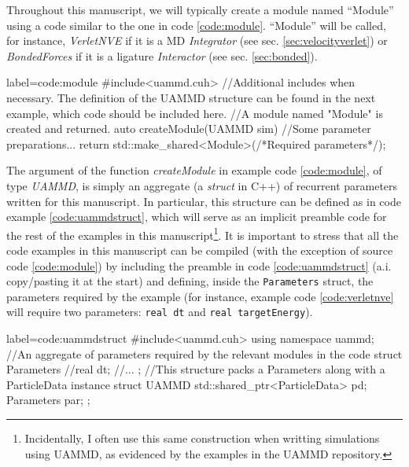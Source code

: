 \documentclass[ twoside,openright,titlepage,numbers=noenddot,%
headinclude,footinclude,cleardoublepage=empty,abstract=on,
BCOR=5mm,paper=a4,fontsize=11pt, dvipsnames
]{scrreprt}
\def\ucpp{uammd_cpp_lexer.py:UAMMDCppLexer -x}
\newcommand{\uammd}{\gls{UAMMD}\xspace}
\begin{document}
Throughout this manuscript, we will typically create a module named ``Module'' using a code similar to the one in code \ref{code:module}. ``Module'' will be called, for instance, \emph{VerletNVE} if it is a \gls{MD} \emph{Integrator} (see sec. \ref{sec:velocityverlet}) or \emph{BondedForces} if it is a ligature \emph{Interactor} (see sec. \ref{sec:bonded}).

\begin{code2}{label=code:module}
#include<uammd.cuh>
//Additional includes when necessary. The definition of the UAMMD structure can be found in the next example, which code should be included here.
//A module named "Module" is created and returned.
auto createModule(UAMMD sim){
  //Some parameter preparations...
  return std::make_shared<Module>(/*Required parameters*/);
}
\end{code2}

The argument of the function \emph{createModule} in example code \ref{code:module}, of type \emph{UAMMD}, is simply an aggregate (a \emph{struct} in C++) of recurrent parameters written for this manuscript. In particular, this structure can be defined as in code example \ref{code:uammdstruct}, which will serve as an implicit preamble code for the rest of the examples in this manuscript\footnote{Incidentally, I often use this same construction when writting simulations using \uammd, as evidenced by the examples in the UAMMD repository.}. It is important to stress that all the code examples in this manuscript can be compiled (with the exception of source code \ref{code:module}) by including the preamble in code \ref{code:uammdstruct} (a.i. copy/pasting it at the start) and defining, inside the \texttt{Parameters} struct, the parameters required by the example (for instance, example code \ref{code:verletnve} will require two parameters: \texttt{real dt} and \texttt{real targetEnergy}).

\begin{code2}
  {label=code:uammdstruct}
#include<uammd.cuh>
using namespace uammd; 
//An aggregate of parameters required by the relevant modules in the code
struct Parameters{
  //real dt;
  //...
};
//This structure packs a Parameters along with a ParticleData instance
struct UAMMD{
  std::shared_ptr<ParticleData> pd;
  Parameters par;
};
\end{code2}
\end{document}
